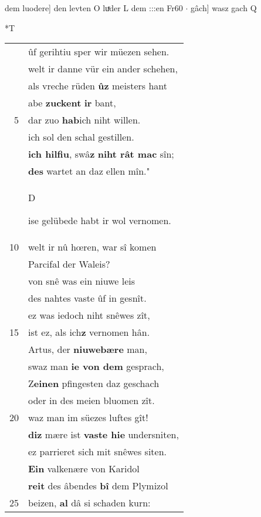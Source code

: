 \documentclass[8pt,a4paper,notitlepage]{article}
\begin{document}
\begin{table}[ht]
\begin{minipage}[t]{0.5\linewidth}
dem luodere] den levten O luͯder L dem :::en Fr60  $\cdot$ gâch] wasz gach Q \newline
\end{minipage}
\hspace{0.5cm}
\begin{minipage}[t]{0.5\linewidth}
\small
\begin{center}*T
\end{center}
\begin{tabular}{rl}
 & ûf gerihtiu sper wir müezen sehen.\\ 
 & welt ir danne vür ein ander schehen,\\ 
 & als vreche rüden \textbf{ûz} meisters hant\\ 
 & abe \textbf{zuckent} \textbf{ir} bant,\\ 
5 & dar zuo \textbf{hab}ich niht willen.\\ 
 & ich sol den schal gestillen.\\ 
 & \textbf{ich hilfiu}, swâ\textbf{z} \textbf{niht rât mac} sîn;\\ 
 & \textbf{des} wartet an daz ellen mîn."\\ 
 & \begin{large}D\end{large}ise gelübede habt ir wol vernomen.\\ 
10 & welt ir nû hœren, war sî komen\\ 
 & Parcifal der Waleis?\\ 
 & von snê was ein niuwe leis\\ 
 & des nahtes vaste ûf in gesnît.\\ 
 & ez was iedoch niht snêwes zît,\\ 
15 & ist ez, als ich\textbf{z} vernomen hân.\\ 
 & Artus, der \textbf{niuwebære} man,\\ 
 & swaz man \textbf{ie von dem} gesprach,\\ 
 & Z\textbf{einen} pfingesten daz geschach\\ 
 & oder in des meien bluomen zît.\\ 
20 & waz man im süezes luftes gît!\\ 
 & \textbf{diz} mære ist \textbf{vaste hie} undersniten,\\ 
 & ez parrieret sich mit snêwes siten.\\ 
 & \textbf{Ein} valkenære von Karidol\\ 
 & \textbf{reit} des âbendes \textbf{bî} dem Plymizol\\ 
25 & beizen, \textbf{al} dâ si schaden kurn:\\ 

\end{tabular}
\end{minipage}
\end{table}
\end{document}

